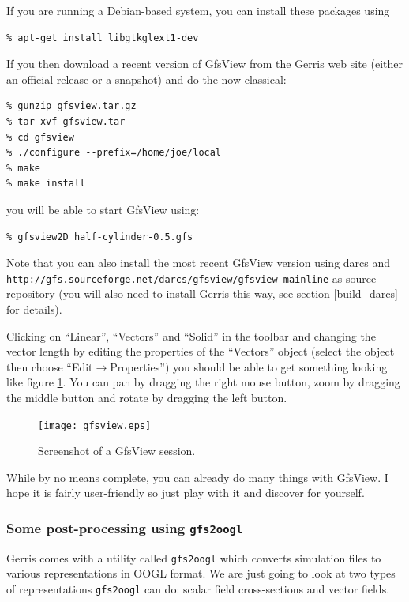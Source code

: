 \documentclass[a4paper]{article}
\begin{document}
If you are running a Debian-based system, you can install these packages using
\begin{verbatim}
% apt-get install libgtkglext1-dev
\end{verbatim}

If you then download a recent version of GfsView from the Gerris web
site (either an official release or a snapshot) and do the now classical:
\begin{verbatim}
% gunzip gfsview.tar.gz
% tar xvf gfsview.tar
% cd gfsview
% ./configure --prefix=/home/joe/local
% make
% make install
\end{verbatim}
you will be able to start GfsView using:
\begin{verbatim}
% gfsview2D half-cylinder-0.5.gfs
\end{verbatim}
Note that you can also install the most recent GfsView version using
darcs and {\tt http://gfs.sourceforge.net/darcs/gfsview/gfsview-mainline} as source
repository (you will also need to install Gerris this way, see section
\ref{build_darcs} for details).

Clicking on ``Linear'', ``Vectors'' and ``Solid'' in the toolbar and
changing the vector length by editing the properties of the
``Vectors'' object (select the object then choose
``Edit$\rightarrow$Properties'') you should be able to get something
looking like figure \ref{gfsview}. You can pan by dragging the right
mouse button, zoom by dragging the middle button and rotate by
dragging the left button.
\begin{figure}[htbp]
\begin{center}
\texttt{[image: gfsview.eps]}
\end{center}
\caption{Screenshot of a GfsView session.}
\label{gfsview}
\end{figure}

While by no means complete, you can already do many things with
GfsView. I hope it is fairly user-friendly so just play with it and
discover for yourself.

\subsubsection{Some post-processing using {\tt gfs2oogl}}

Gerris comes with a utility called {\tt gfs2oogl} which converts
simulation files to various representations in {\sc OOGL} format. We are
just going to look at two types of representations {\tt gfs2oogl} can
do: scalar field cross-sections and vector fields.
\end{document}
